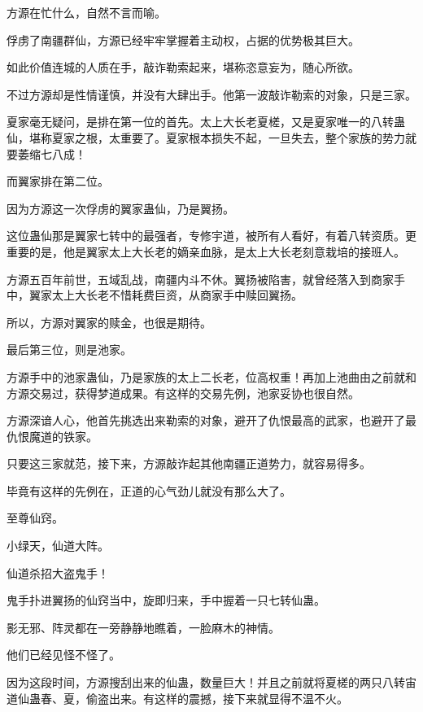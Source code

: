 
\begin{this_body}



方源在忙什么，自然不言而喻。

俘虏了南疆群仙，方源已经牢牢掌握着主动权，占据的优势极其巨大。

如此价值连城的人质在手，敲诈勒索起来，堪称恣意妄为，随心所欲。

不过方源却是性情谨慎，并没有大肆出手。他第一波敲诈勒索的对象，只是三家。

夏家毫无疑问，是排在第一位的首先。太上大长老夏槎，又是夏家唯一的八转蛊仙，堪称夏家之根，太重要了。夏家根本损失不起，一旦失去，整个家族的势力就要萎缩七八成！

而翼家排在第二位。

因为方源这一次俘虏的翼家蛊仙，乃是翼扬。

这位蛊仙那是翼家七转中的最强者，专修宇道，被所有人看好，有着八转资质。更重要的是，他是翼家太上大长老的嫡亲血脉，是太上大长老刻意栽培的接班人。

方源五百年前世，五域乱战，南疆内斗不休。翼扬被陷害，就曾经落入到商家手中，翼家太上大长老不惜耗费巨资，从商家手中赎回翼扬。

所以，方源对翼家的赎金，也很是期待。

最后第三位，则是池家。

方源手中的池家蛊仙，乃是家族的太上二长老，位高权重！再加上池曲由之前就和方源交易过，获得梦道成果。有这样的交易先例，池家妥协也很自然。

方源深谙人心，他首先挑选出来勒索的对象，避开了仇恨最高的武家，也避开了最仇恨魔道的铁家。

只要这三家就范，接下来，方源敲诈起其他南疆正道势力，就容易得多。

毕竟有这样的先例在，正道的心气劲儿就没有那么大了。

至尊仙窍。

小绿天，仙道大阵。

仙道杀招大盗鬼手！

鬼手扑进翼扬的仙窍当中，旋即归来，手中握着一只七转仙蛊。

影无邪、阵灵都在一旁静静地瞧着，一脸麻木的神情。

他们已经见怪不怪了。

因为这段时间，方源搜刮出来的仙蛊，数量巨大！并且之前就将夏槎的两只八转宙道仙蛊春、夏，偷盗出来。有这样的震撼，接下来就显得不温不火。


\end{this_body}
